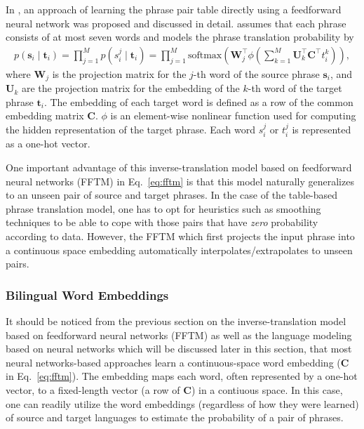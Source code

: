 \documentclass[11pt, oneside]{essay}
\newcommand{\softmax}{\text{softmax}}
\newcommand{\vect}[1]{\mathbf{#1}}
\newcommand{\matr}[1]{\mathbf{#1}}
\newcommand{\vs}[0]{\vect{s}}
\newcommand{\vt}[0]{\vect{t}}
\newcommand{\mW}[0]{\matr{W}}
\newcommand{\mU}[0]{\matr{U}}
\newcommand{\mC}{\matr{C}}
\begin{document}
In \citep{Schwenk2012,Son2012}, an approach of learning the phrase
pair table directly using a feedforward neural network was
proposed and discussed in detail. \citet{Schwenk2012} assumes that
each phrase consists of at most seven words and models the phrase
translation probability by
\begin{align}
\label{eq:fftm}
p(\vs_i \mid \vt_i) = \prod_{j=1}^M p(s_i^j \mid \vt_i) 
                     = \prod_{j=1}^M \softmax\left( \mW_j^\top
                             \phi \left( \sum_{k=1}^M \mU_k^\top
                                 \mC^\top t_i^k  \right) \right),
\end{align}
where $\mW_j$ is the projection matrix for the $j$-th word of the
source phrase $\vs_i$, and $\mU_k$ are the projection
matrix for the embedding of the $k$-th word of the target phrase
$\vt_i$. The embedding of each target word is defined as a row of
the common embedding matrix $\mC$. $\phi$ is an element-wise
nonlinear function used for computing the hidden representation
of the target phrase. Each word $s_i^j$ or $t_i^j$ is represented
as a one-hot vector.

One important advantage of this inverse-translation model based
on feedforward neural networks (FFTM) in Eq.~\eqref{eq:fftm} is
that this model naturally generalizes to an unseen pair of source
and target phrases. In the case of the table-based phrase
translation model, one has to opt for heuristics such as
smoothing techniques to be able to cope with those pairs that
have \textit{zero} probability according to data. However, the
FFTM which first projects the input phrase into a continuous
space embedding automatically interpolates/extrapolates to unseen
pairs.


\subsubsection{Bilingual Word Embeddings}

It should be noticed from the previous section on the
inverse-translation model based on feedforward neural networks
(FFTM) as well as the language modeling based on neural networks
which will be discussed later in this section, that most neural
networks-based approaches learn a continuous-space word embedding
($\mC$ in Eq.~\eqref{eq:fftm}). The embedding maps each word,
often represented by a one-hot vector, to a fixed-length
vector (a row of $\mC$) in a contiuous space.  In this case,
one can readily utilize the word embeddings (regardless of how
they were learned) of source and target languages to
estimate the probability of a pair of phrases. 
\end{document}
